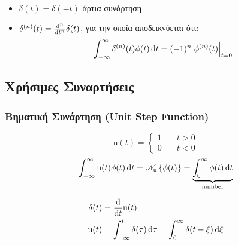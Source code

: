     \paragraph{}

    \begin{itemize}
    	\item \( \delta(t)=\delta(-t) \) άρτια συνάρτηση
    	\item \( \delta^{(n)}(t) = \od[n]{}{t}\delta(t) \), για την οποία
    αποδεικνύεται ότι:
        \[
            \int_{-\infty}^{\infty} \delta^{(n)}(t)\phi(t)\mathop{}\!\mathrm{d} t
            = (-1)^n\left.\phi^{(n)}(t)\right|_{t=0}
        \]
    \end{itemize}

    \subsection{Χρήσιμες Συναρτήσεις}

    \subsubsection{Βηματική Συνάρτηση (Unit Step Function)}
    \[
    \mathrm u(t) = \begin{cases}
    1 \quad & t > 0 \\
    0 \quad & t < 0
    \end{cases}
    \]
    \[
    \int_{-\infty}^{\infty} \mathrm u(t)\phi(t)\dif t =
    \mathscr N_{\mathrm u}\left\lbrace \phi(t) \right\rbrace =
    \underbrace{ \int_0^\infty \phi(t)\dif t}_{\mathclap{\text{number}}}
    \]

    \begin{align*}
    \delta(t) &= \od{}{t} \mathrm u(t)\\
    \mathrm u(t) &= \int_{-\infty}^t \delta(\tau)\dif\tau =
    \int_0^\infty \delta(t-\xi)\dif\xi
    \end{align*}

